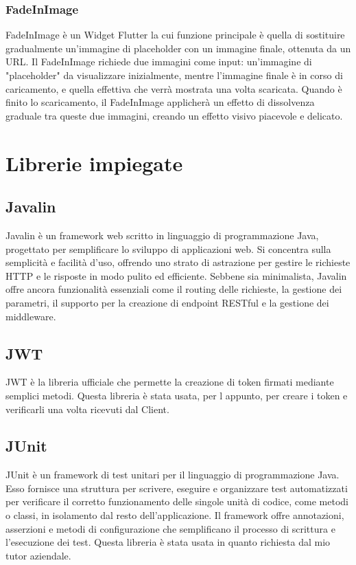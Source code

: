 \subsubsection{FadeInImage} \label{subsub:fadeinimage}
FadeInImage \cite{fadeinimage} è un Widget Flutter la cui funzione principale è quella di sostituire gradualmente un'immagine di placeholder con un immagine finale, ottenuta da un URL. Il FadeInImage richiede due immagini come input: un'immagine di "placeholder" da visualizzare inizialmente, mentre l'immagine finale è in corso di caricamento, e quella effettiva che verrà mostrata una volta scaricata. Quando è finito lo scaricamento, il FadeInImage applicherà un effetto di dissolvenza graduale tra queste due immagini, creando un effetto visivo piacevole e delicato.

\section{Librerie impiegate}
\subsection{Javalin}
Javalin \cite{javalin} è un framework web scritto in linguaggio di programmazione Java, progettato per semplificare lo sviluppo di applicazioni web. Si concentra sulla semplicità e facilità d'uso, offrendo uno strato di astrazione per gestire le richieste HTTP e le risposte in modo pulito ed efficiente. Sebbene sia minimalista, Javalin offre ancora funzionalità essenziali come il routing delle richieste, la gestione dei parametri, il supporto per la creazione di endpoint RESTful e la gestione dei middleware.

\subsection{JWT} \label{sub:jwt}
JWT \cite{JWT_lib} è la libreria ufficiale che permette la creazione di token firmati mediante semplici metodi. Questa libreria è stata usata, per l appunto, per creare i token e verificarli una volta ricevuti dal Client.

\subsection{JUnit}
JUnit \cite{junit} è un framework di test unitari per il linguaggio di programmazione Java. Esso fornisce una struttura per scrivere, eseguire e organizzare test automatizzati per verificare il corretto funzionamento delle singole unità di codice, come metodi o classi, in isolamento dal resto dell'applicazione.
Il framework offre annotazioni, asserzioni e metodi di configurazione che semplificano il processo di scrittura e l'esecuzione dei test. Questa libreria è stata usata in quanto richiesta dal mio tutor aziendale.

